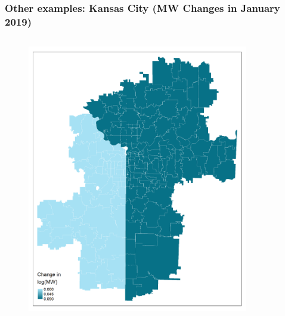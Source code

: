 \documentclass[aspectratio=169, t]{beamer}
\begin{document}
\begin{frame}[label = kc_example]
\frametitle{Other examples: Kansas City (MW Changes in January 2019)}
    \begin{columns}
        \begin{column}{0.50\textwidth}
            \vspace{-4mm}
            \begin{figure}
                \centering
                \includegraphics[scale = 0.36]{maps_events/output/kc_2018-12_actual_mw.png}
            \end{figure}   
        \end{column}
        \begin{column}{0.50\textwidth}
            \vspace{-4mm}
            \begin{figure}
                \centering

\end{figure}
\end{column}
\end{columns}
\end{frame}
\end{document}
